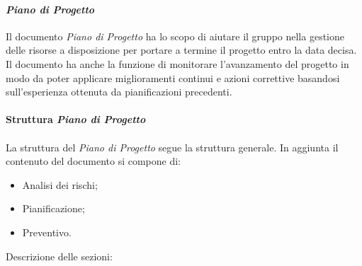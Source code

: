 \paragraph{\textit{Piano di Progetto}}

Il documento \textit{\textit{Piano di Progetto}} ha lo scopo di aiutare il gruppo nella gestione delle risorse a disposizione per portare a termine il progetto entro la data decisa.
Il documento ha anche la funzione di monitorare l'avanzamento del progetto in modo da poter applicare miglioramenti continui e azioni correttive
basandosi sull'esperienza ottenuta da pianificazioni precedenti.
\\\\
\textbf{Struttura \textit{\textit{Piano di Progetto}}}
\\\\
La struttura del \textit{\textit{Piano di Progetto}} segue la struttura generale.
In aggiunta il contenuto del documento si compone di:
\begin{itemize}
    \item Analisi dei rischi;
    \item Pianificazione;
    \item Preventivo.
\end{itemize}
Descrizione delle sezioni:
